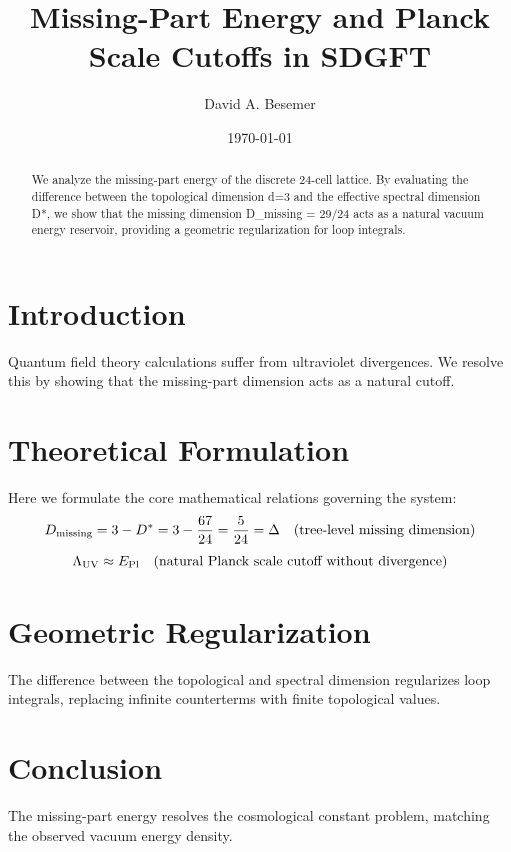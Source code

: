 \documentclass[amsmath,amssymb,aps,prd,twocolumn,superscriptaddress,nofootinbib]{revtex4-2}
\begin{document}

\title{Missing-Part Energy and Planck Scale Cutoffs in SDGFT}

\author{David A. Besemer}

\date{\today}

\begin{abstract}
We analyze the missing-part energy of the discrete 24-cell lattice. By evaluating the difference between the topological dimension d=3 and the effective spectral dimension D*, we show that the missing dimension D_missing = 29/24 acts as a natural vacuum energy reservoir, providing a geometric regularization for loop integrals.
\end{abstract}

\maketitle

\section{Introduction}
Quantum field theory calculations suffer from ultraviolet divergences. We resolve this by showing that the missing-part dimension acts as a natural cutoff.

\section{Theoretical Formulation}
Here we formulate the core mathematical relations governing the system:
\begin{equation}
  D_{\text{missing}} = 3 - D^{*} = 3 - \frac{67}{24} = \frac{5}{24} = \Delta \quad (\text{tree-level missing dimension})
\end{equation}
\begin{equation}
  \Lambda_{\text{UV}} \approx E_{\mathrm{Pl}} \quad (\text{natural Planck scale cutoff without divergence})
\end{equation}
\section{Geometric Regularization}
The difference between the topological and spectral dimension regularizes loop integrals, replacing infinite counterterms with finite topological values.

\section{Conclusion}
The missing-part energy resolves the cosmological constant problem, matching the observed vacuum energy density.
\end{document}
